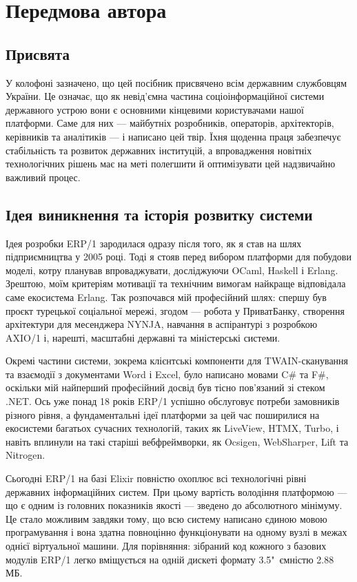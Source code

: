 \chapter*{Передмова автора}

\section*{Присвята}

У колофоні зазначено, що цей посібник присвячено всім державним службовцям України. Це означає, що як невід'ємна частина соціоінформаційної системи державного устрою вони є основними кінцевими користувачами нашої платформи. Саме для них — майбутніх розробників, операторів, архітекторів, керівників та аналітиків — і написано цей твір. Їхня щоденна праця забезпечує стабільність та розвиток державних інституцій, а впровадження новітніх технологічних рішень має на меті полегшити й оптимізувати цей надзвичайно важливий процес.

\section*{Ідея виникнення та історія розвитку системи}

Ідея розробки ERP/1 зародилася одразу після того, як я став на шлях підприємництва у 2005 році. Тоді я стояв перед вибором платформи для побудови моделі, котру планував впроваджувати, досліджуючи OCaml, Haskell і Erlang. Зрештою, моїм критеріям мотивації та технічним вимогам найкраще відповідала саме екосистема Erlang. Так розпочався мій професійний шлях: спершу був проєкт турецької соціальної мережі, згодом — робота у ПриватБанку, створення архітектури для месенджера NYNJA, навчання в аспірантурі з розробкою AXIO/1 і, нарешті, масштабні державні та міністерські системи.

Окремі частини системи, зокрема клієнтські компоненти для TWAIN-сканування та взаємодії з документами Word і Excel, було написано мовами C\# та F\#, оскільки мій найперший професійний досвід був тісно пов'язаний зі стеком .NET. Ось уже понад 18 років ERP/1 успішно обслуговує потреби замовників різного рівня, а фундаментальні ідеї платформи за цей час поширилися на екосистеми багатьох сучасних технологій, таких як LiveView, HTMX, Turbo, і навіть вплинули на такі старіші вебфреймворки, як Ocsigen, WebSharper, Lift та Nitrogen.

Сьогодні ERP/1 на базі Elixir повністю охоплює всі технологічні рівні державних інформаційних систем. При цьому вартість володіння платформою — що є одним із головних показників якості — зведено до абсолютного мінімуму. Це стало можливим завдяки тому, що всю систему написано єдиною мовою програмування і вона здатна повноцінно функціонувати на одному вузлі в межах однієї віртуальної машини. Для порівняння: зібраний код кожного з базових модулів ERP/1 легко вміщується на одній дискеті формату 3.5"\ ємністю 2.88 МБ.


